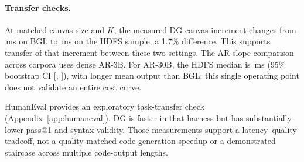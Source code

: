 \paragraph{Transfer checks.}
At matched canvas size and $K$, the measured DG canvas increment changes
from \bglStep\,ms on BGL to \hdfsStep\,ms on the HDFS sample, a
1.7\% difference. This supports transfer of that increment between these
two settings. The AR slope comparison across corpora uses dense AR-3B.
For AR-30B, the HDFS median is \hdfsMedian\,ms (95\% bootstrap CI
[\hdfsCiLo, \hdfsCiHi]), with longer mean output than BGL; this
single operating point does not validate an entire cost curve.

HumanEval provides an exploratory task-transfer check
(Appendix~\ref{app:humaneval}). DG is faster in that harness but has
substantially lower pass@1 and syntax validity. Those measurements support
a latency--quality tradeoff, not a quality-matched code-generation speedup
or a demonstrated staircase across multiple code-output lengths.
